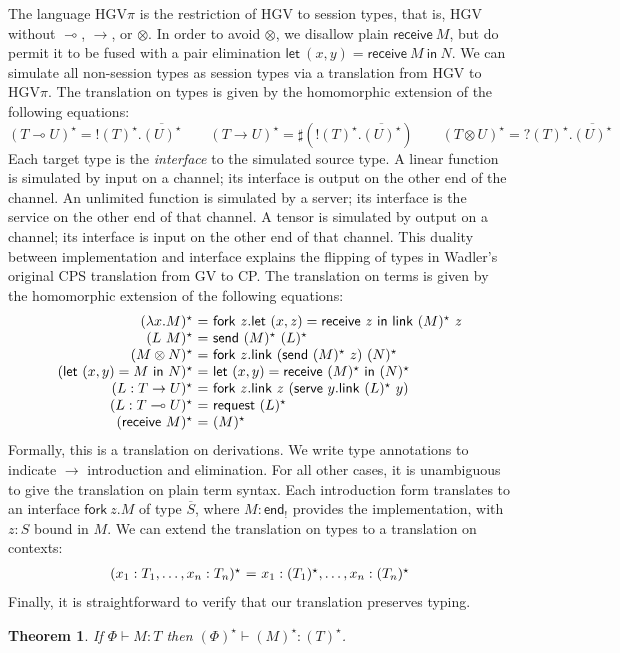\documentclass{easychair}
\makeatletter
\newtheorem{theorem}{Theorem}
\newcommand{\ba}{\begin{array}}
\newcommand{\ea}{\end{array}}
\newenvironment{equations}{\[\ba{@{}r@{~}c@{~}l@{}}}{\ea\]}
\newcommand{\key}{\mathsf}
\newcommand{\gvOutput}[2]{\mathord{!}{#1}.{#2}}
\newcommand{\gvInput}[2]{\mathord{?}{#1}.{#2}}
\newcommand{\gvEndOutput}{\key{end}_!}
\newcommand{\gvService}[1]{\sharp {#1}}
\newcommand{\gvDual}[1]{\overline{#1}}
\newcommand{\gvj}[3]{{#1} \vdash {#2} : {#3}}
\newcommand{\lolli}{\multimap}
\newcommand{\gvLinFun}[2]{{#1} \lolli {#2}}
\newcommand{\gvUnFun}[2]{{#1} \to {#2}}
\newcommand{\gvTimes}[2]{{#1} \otimes {#2}}
\newcommand{\gvLink}[2]{\key{link}~{#1}~{#2}}
\newcommand{\gvLam}[2]{\lambda {#1}.{#2}}
\newcommand{\gvApp}[2]{{#1}~{#2}}
\newcommand{\gvPair}[2]{({#1},{#2})}
\newcommand{\gvLet}[3]{\key{let}~{#1}={#2}~\key{in}~{#3}}
\newcommand{\gvSend}[2]{\key{send}~{#1}~{#2}}
\newcommand{\gvReceive}[1]{\key{receive}~{#1}}
\newcommand{\gvFork}[2]{\key{fork}~{#1}.{#2}}
\newcommand{\gvReceiveK}[4]{\gvLet{\gvPair{#1}{#2}}{\gvReceive{#3}}{#4}}
\newcommand{\gvServe}[2]{\key{serve}~{#1}.{#2}}
\newcommand{\gvRequest}[1]{\key{request}~{#1}}
\newcommand{\hgv}{HGV\xspace}
\newcommand{\hgvpi}{HGV$\pi$\xspace}
\newcommand{\lampi}[1]{({#1})^\star}
\makeatother
\begin{document}
The language \hgvpi is the restriction of \hgv to session types, that is, \hgv without $\lolli$,
$\to$, or $\otimes$. In order to avoid $\otimes$, we disallow plain $\gvReceive{M}$, but do permit
it to be fused with a pair elimination $\gvReceiveK{x}{y}{M}{N}$. We can simulate all non-session
types as session types via a translation from \hgv to \hgvpi. The translation on types is given by
the homomorphic extension of the following equations:
\[
\lampi{\gvLinFun{T}{U}} = \gvOutput{\lampi{T}}{\gvDual{\lampi{U}}} \qquad
\lampi{\gvUnFun{T}{U}} = \gvService{(\gvOutput{\lampi{T}}{\gvDual{\lampi{U}}})} \qquad
\lampi{\gvTimes{T}{U}} = \gvInput{\lampi{T}}{\gvDual{\lampi{U}}}
\]%
Each target type is the \emph{interface} to the simulated source type. A linear function is
simulated by input on a channel; its interface is output on the other end of the channel. An
unlimited function is simulated by a server; its interface is the service on the other end of that
channel. A tensor is simulated by output on a channel; its interface is input on the other end of
that channel.
%
This duality between implementation and interface explains the flipping of types in Wadler's
original CPS translation from GV to CP.
%
The translation on terms is given by the homomorphic extension of the following equations:
\begin{equations}
\lampi{\gvLam{x}{M}} &=& \gvFork{z}{\gvLet{\gvPair{x}{z}}{\gvReceive{z}}{\gvLink{\lampi{M}}{z}}} \\
\lampi{\gvApp{L}{M}} &=& \gvSend{\lampi{M}}{\lampi{L}} \\
\lampi{\gvTimes{M}{N}} &=&
  \gvFork{z}
    {\gvLink{(\gvSend{\lampi{M}}{z})}{\lampi{N}}} \\
\lampi{\gvLet{\gvPair{x}{y}}{M}{N}} &=&
    \gvLet{\gvPair{x}{y}}{\gvReceive{\lampi{M}}}{\lampi{N}} \\
\lampi{L : \gvUnFun{T}{U}} &=&
  \gvFork{z}{\gvLink{z}{(\gvServe{y}{\gvLink{\lampi{L}}{y}})}} \\
\lampi{L : \gvLinFun{T}{U}} &=& \gvRequest{\lampi{L}} \\
\lampi{\gvReceive{M}} &=& \lampi{M} \\
\end{equations}%
Formally, this is a translation on derivations. We write type annotations to indicate $\to$
introduction and elimination. For all other cases, it is unambiguous to give the translation on
plain term syntax. Each introduction form translates to an interface $\gvFork{z}{M}$ of type
$\gvDual{S}$, where $M : \gvEndOutput$ provides the implementation, with $z : S$ bound in $M$.
We can extend the translation on types to a translation on contexts:
\begin{equations}
\lampi{x_1:T_1, \dots, x_n:T_n} &=& x_1:\lampi{T_1}, \dots, x_n:\lampi{T_n} \\
\end{equations}%
Finally, it is straightforward to verify that our translation preserves typing.
\begin{theorem}
If $\gvj{\Phi}{M}{T}$ then $\gvj{\lampi{\Phi}}{\lampi{M}}{\lampi{T}}$.
\end{theorem}
\end{document}
